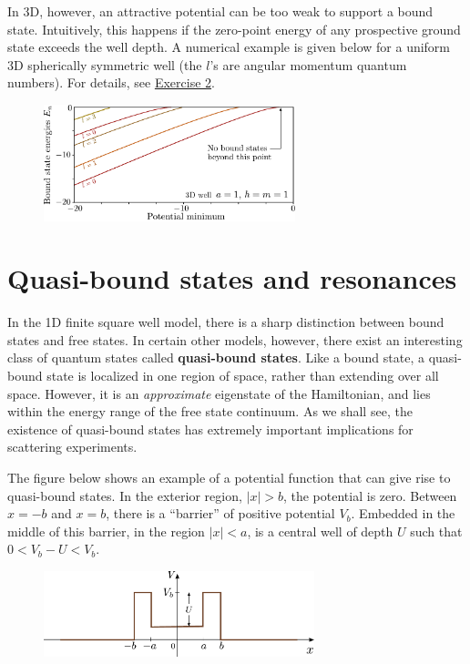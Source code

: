 \documentclass[pra,12pt]{revtex4}
\begin{document}
In 3D, however, an attractive potential can be too weak to support a
bound state.  Intuitively, this happens if the zero-point energy of
any prospective ground state exceeds the well depth.  A numerical
example is given below for a uniform 3D spherically symmetric well
(the $l$'s are angular momentum quantum numbers).  For details, see
\hyperref[ex:boundstate3d]{Exercise 2}.

\begin{figure}[h]
  \centering\includegraphics[width=0.65\textwidth]{boundstate3d}
\end{figure}

\section{Quasi-bound states and resonances}
\label{sec:resonances}

In the 1D finite square well model, there is a sharp distinction
between bound states and free states.  In certain other models,
however, there exist an interesting class of quantum states called
\textbf{quasi-bound states}.  Like a bound state, a quasi-bound state
is localized in one region of space, rather than extending over all
space.  However, it is an \textit{approximate} eigenstate of the
Hamiltonian, and lies within the energy range of the free state
continuum.  As we shall see, the existence of quasi-bound states has
extremely important implications for scattering experiments.

The figure below shows an example of a potential function that can
give rise to quasi-bound states.  In the exterior region, $|x| > b$,
the potential is zero.  Between $x = -b$ and $x = b$, there is a
``barrier'' of positive potential $V_b$.  Embedded in the middle of
this barrier, in the region $|x| < a$, is a central well of depth $U$
such that $0 < V_b - U < V_b$.

\begin{figure}[h]
  \centering\includegraphics[width=0.7\textwidth]{resonancewell}
\end{figure}
\end{document}
